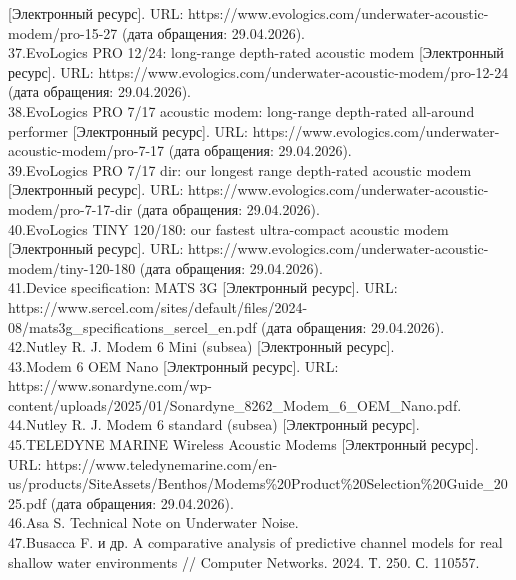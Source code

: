\documentclass[
    numbers=section,
    document-code={ВКРБ--09.03.04--10.19--XX--26--81}
]{../latex/fqw}
\providecommand{\hl}[1]{#1}
\begin{document}
{            {[}Электронный ресурс{]}. URL:
        https://www.evologics.com/underwater-acoustic-modem/pro-15-27 (дата
        обращения: 29.04.2026).\\
        37.EvoLogics PRO 12/24: long-range depth-rated acoustic modem
            {[}Электронный ресурс{]}. URL:
        https://www.evologics.com/underwater-acoustic-modem/pro-12-24 (дата
        обращения: 29.04.2026).\\
        38.EvoLogics PRO 7/17 acoustic modem: long-range depth-rated all-around
        performer {[}Электронный ресурс{]}. URL:
        https://www.evologics.com/underwater-acoustic-modem/pro-7-17 (дата
        обращения: 29.04.2026).\\
        39.EvoLogics PRO 7/17 dir: our longest range depth-rated acoustic modem
            {[}Электронный ресурс{]}. URL:
        https://www.evologics.com/underwater-acoustic-modem/pro-7-17-dir (дата
        обращения: 29.04.2026).\\
        40.EvoLogics TINY 120/180: our fastest ultra-compact acoustic modem
            {[}Электронный ресурс{]}. URL:
        https://www.evologics.com/underwater-acoustic-modem/tiny-120-180 (дата
        обращения: 29.04.2026).\\
        41.Device specification: MATS 3G {[}Электронный ресурс{]}. URL:
        https://www.sercel.com/sites/default/files/2024-08/mats3g\_specifications\_sercel\_en.pdf
        (дата обращения: 29.04.2026).\\
        42.Nutley R. J. Modem 6 Mini (subsea) {[}Электронный ресурс{]}.\\
        43.Modem 6 OEM Nano {[}Электронный ресурс{]}. URL:
        https://www.sonardyne.com/wp-content/uploads/2025/01/Sonardyne\_8262\_Modem\_6\_OEM\_Nano.pdf.\\
        44.Nutley R. J. Modem 6 standard (subsea) {[}Электронный ресурс{]}.\\
        45.TELEDYNE MARINE Wireless Acoustic Modems {[}Электронный ресурс{]}.
        URL:
        https://www.teledynemarine.com/en-us/products/SiteAssets/Benthos/Modems\%20Product\%20Selection\%20Guide\_2025.pdf
        (дата обращения: 29.04.2026).\\
        46.Asa S. Technical Note on Underwater Noise.\\
        47.Busacca F. и др. A comparative analysis of predictive channel models
        for real shallow water environments // Computer Networks. 2024. Т. 250.
        С. 110557.}

    \hl{}
\end{document}
